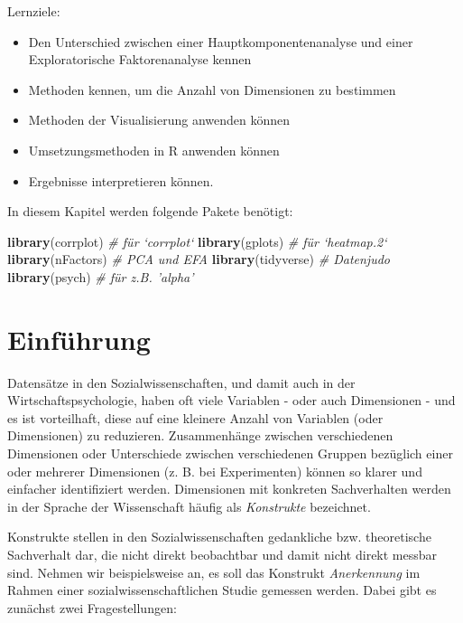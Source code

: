\documentclass[12pt,ngerman,]{book}
\makeatletter
\newenvironment{Shaded}{\begin{snugshade}}{\end{snugshade}}
\newcommand{\KeywordTok}[1]{\textcolor[rgb]{0.13,0.29,0.53}{\textbf{{#1}}}}
\newcommand{\CommentTok}[1]{\textcolor[rgb]{0.56,0.35,0.01}{\textit{{#1}}}}
\newcommand{\NormalTok}[1]{{#1}}
\providecommand{\tightlist}{%
  \setlength{\itemsep}{0pt}\setlength{\parskip}{0pt}}
\newenvironment{kframe}{%
\medskip{}
\setlength{\fboxsep}{.8em}
 \def\at@end@of@kframe{}%
 \ifinner\ifhmode%
  \def\at@end@of@kframe{\end{minipage}}%
  \begin{minipage}{\columnwidth}%
 \fi\fi%
 \def\FrameCommand##1{\hskip\@totalleftmargin \hskip-\fboxsep
 \colorbox{shadecolor}{##1}\hskip-\fboxsep
     \hskip-\linewidth \hskip-\@totalleftmargin \hskip\columnwidth}%
 \MakeFramed {\advance\hsize-\width
   \@totalleftmargin\z@ \linewidth\hsize
   \@setminipage}}%
 {\par\unskip\endMakeFramed%
 \at@end@of@kframe}
\renewenvironment{Shaded}{\begin{kframe}}{\end{kframe}}
\theoremstyle{definition}
\theoremstyle{definition}
\theoremstyle{remark}
\let\BeginKnitrBlock\begin \let\EndKnitrBlock\end
\makeatother
\begin{document}
\BeginKnitrBlock{rmdcaution}
Lernziele:

\begin{itemize}
\tightlist
\item
  Den Unterschied zwischen einer Hauptkomponentenanalyse und einer
  Exploratorische Faktorenanalyse kennen
\item
  Methoden kennen, um die Anzahl von Dimensionen zu bestimmen
\item
  Methoden der Visualisierung anwenden können
\item
  Umsetzungsmethoden in R anwenden können
\item
  Ergebnisse interpretieren können.
\end{itemize}
\EndKnitrBlock{rmdcaution}

In diesem Kapitel werden folgende Pakete benötigt:

\begin{Shaded}
\begin{Highlighting}[]
\KeywordTok{library}\NormalTok{(corrplot)  }\CommentTok{# für `corrplot`}
\KeywordTok{library}\NormalTok{(gplots)  }\CommentTok{# für `heatmap.2`}
\KeywordTok{library}\NormalTok{(nFactors)  }\CommentTok{# PCA und EFA}
\KeywordTok{library}\NormalTok{(tidyverse)  }\CommentTok{# Datenjudo}
\KeywordTok{library}\NormalTok{(psych)  }\CommentTok{# für z.B. 'alpha'}
\end{Highlighting}
\end{Shaded}

\section{Einführung}\label{einfuhrung-1}

Datensätze in den Sozialwissenschaften, und damit auch in der
Wirtschaftspsychologie, haben oft viele Variablen - oder auch
Dimensionen - und es ist vorteilhaft, diese auf eine kleinere Anzahl von
Variablen (oder Dimensionen) zu reduzieren. Zusammenhänge zwischen
verschiedenen Dimensionen oder Unterschiede zwischen verschiedenen
Gruppen bezüglich einer oder mehrerer Dimensionen (z. B. bei
Experimenten) können so klarer und einfacher identifiziert werden.
Dimensionen mit konkreten Sachverhalten werden in der Sprache der
Wissenschaft häufig als \emph{Konstrukte} bezeichnet.

Konstrukte stellen in den Sozialwissenschaften gedankliche bzw.
theoretische Sachverhalt dar, die nicht direkt beobachtbar und damit
nicht direkt messbar sind. Nehmen wir beispielsweise an, es soll das
Konstrukt \emph{Anerkennung} im Rahmen einer sozialwissenschaftlichen
Studie gemessen werden. Dabei gibt es zunächst zwei Fragestellungen:
\end{document}
